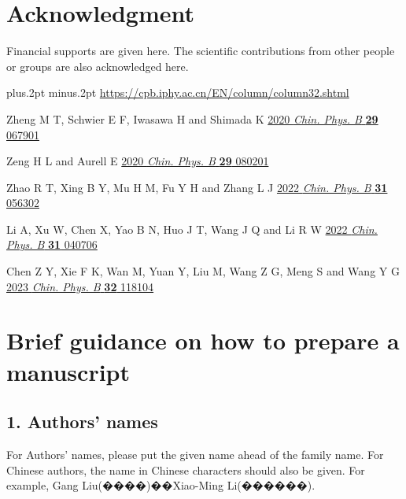 \documentclass{cpbtex}
\begin{document}
\begin{CJK*}{GBK}{song}
\section*{Acknowledgment}
Financial supports are given here. The scientific contributions from other people or groups are also acknowledged here.




\begin{thebibliography}{99}\footnotesize
\itemsep=-3pt plus.2pt minus.2pt   %
 \href{https://cpb.iphy.ac.cn/EN/column/column32.shtml}{https://cpb.iphy.ac.cn/EN/column/column32.shtml}


  Zheng M T, Schwier E F, Iwasawa H and Shimada K \href{https://doi.org/10.1088/1674-1056/ab9196}{2020 \emph{Chin. Phys. B} \textbf{29} 067901}

 Zeng H L and Aurell E \href{https://doi.org/10.1088/1674-1056/ab8da6}{2020 \emph{Chin. Phys. B} \textbf{29} 080201}

 Zhao R T, Xing B Y, Mu H M, Fu Y H and Zhang L J
\href{https://doi.org/10.1088/1674-1056/ac5d2d}{2022 \emph{Chin. Phys. B} \textbf{31} 056302}


 Li A, Xu W, Chen X, Yao B N, Huo J T, Wang J Q and Li R W
\href{http://dx.doi.org/10.1088/1674-1056/ac4a70}{2022 \emph{Chin. Phys. B} \textbf{31} 040706}

 Chen Z Y, Xie F K, Wan M, Yuan Y, Liu M, Wang Z G, Meng S and Wang Y G
\href{http://dx.doi.org/10.1088/1674-1056/ad04cb}{2023 \emph{Chin. Phys. B} \textbf{32} 118104}

\end{thebibliography}

\newpage

\section*{Brief guidance on how to prepare a manuscript}

\subsection*{1. Authors' names}
For Authors' names, please put the given name ahead of the family name. For Chinese authors, the name in Chinese characters should also be given. For example, Gang Liu(����)��Xiao-Ming Li(������).


\end{CJK*}
\end{document}
